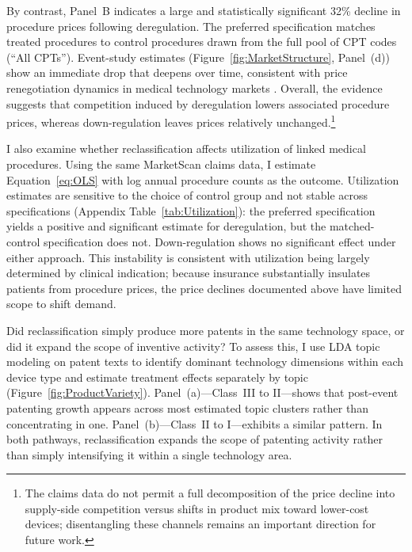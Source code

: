 \documentclass[letterpaper,12pt]{article}
\theoremstyle{definition}
\begin{document}
By contrast, Panel~B indicates a large and statistically significant 32\% decline in procedure prices following deregulation. The preferred specification matches treated procedures to control procedures drawn from the full pool of CPT codes (``All CPTs'').\footnotemark {} Event-study estimates (Figure~\ref{fig:MarketStructure}, Panel~(d)) show an immediate drop that deepens over time, consistent with price renegotiation dynamics in medical technology markets \citep{reinhardt2006pricing,grennan2020transparency}. Overall, the evidence suggests that competition induced by deregulation lowers associated procedure prices, whereas down-regulation leaves prices relatively unchanged.\footnote{The claims data do not permit a full decomposition of the price decline into supply-side competition versus shifts in product mix toward lower-cost devices; disentangling these channels remains an important direction for future work.}

I also examine whether reclassification affects utilization of linked medical procedures. Using the same MarketScan claims data, I estimate Equation~\ref{eq:OLS} with log annual procedure counts as the outcome. Utilization estimates are sensitive to the choice of control group and not stable across specifications (Appendix Table~\ref{tab:Utilization}): the preferred specification yields a positive and significant estimate for deregulation, but the matched-control specification does not. Down-regulation shows no significant effect under either approach. This instability is consistent with utilization being largely determined by clinical indication; because insurance substantially insulates patients from procedure prices, the price declines documented above have limited scope to shift demand.

Did reclassification simply produce more patents in the same technology space, or did it expand the scope of inventive activity? To assess this, I use LDA topic modeling on patent texts to identify dominant technology dimensions within each device type and estimate treatment effects separately by topic (Figure~\ref{fig:ProductVariety}).\footnotemark {} Panel~(a)---Class~III to II---shows that post-event patenting growth appears across most estimated topic clusters rather than concentrating in one. Panel~(b)---Class~II to I---exhibits a similar pattern. In both pathways, reclassification expands the scope of patenting activity rather than simply intensifying it within a single technology area.
\end{document}
